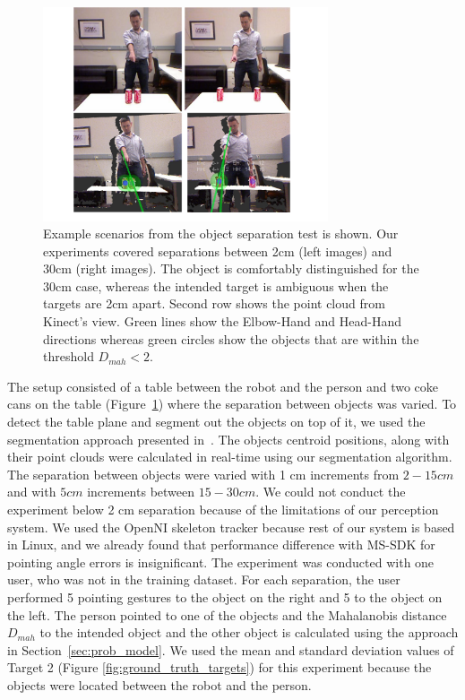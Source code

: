 \documentclass[12pt]{gatech-thesis}
\begin{document}
\begin{figure}[ht!]
\centering
\includegraphics[width=0.75\textwidth]{pics/separation_2_cropped}


\caption{Example scenarios from the object separation test is shown. Our experiments covered separations between 2cm (left images) and 30cm (right images). The object is comfortably distinguished for the 30cm case, whereas the intended target is ambiguous when the targets are 2cm apart. Second row shows the point cloud from Kinect's view. Green lines show the Elbow-Hand and Head-Hand directions whereas green circles show the objects that are within the threshold $D_{mah}<2$.}
\vspace{-0.5cm}
\label{fig:pointing_separation}
\end{figure}

The setup consisted of a table between the robot and the person and two coke cans on the table (Figure~\ref{fig:pointing_separation}) where the separation between objects was varied. To detect the table plane and segment out the objects on top of it, we used the segmentation approach presented in~\cite{trevor2013segmentation}. The objects centroid positions, along with their point clouds were calculated in real-time using our segmentation algorithm. The separation between objects were varied with 1 cm increments from $2-15cm$ and with $5cm$ increments between $15-30 cm$. We could not conduct the experiment below 2 cm separation because of the limitations of our perception system. We used the OpenNI skeleton tracker because rest of our system is based in Linux, and we already found that performance difference with MS-SDK for pointing angle errors is insignificant. The experiment was conducted with one user, who was not in the training dataset. For each separation, the user performed 5 pointing gestures to the object on the right and 5 to the object on the left. The person pointed to one of the objects and the Mahalanobis distance $D_{mah}$ to the intended object and the other object is calculated using the approach in Section~\ref{sec:prob_model}. We used the mean and standard deviation values of Target 2 (Figure \ref{fig:ground_truth_targets}) for this experiment because the objects were located between the robot and the person.
\end{document}

